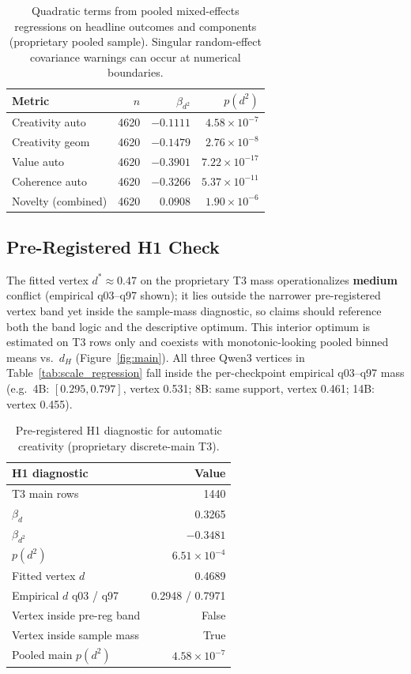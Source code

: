 \documentclass[sigconf,nonacm]{acmart}
\begin{document}
\begin{table}[t]
\centering
\small
\begin{tabular}{lrrr}
\toprule
Metric & $n$ & $\beta_{d^2}$ & $p(d^2)$ \\
\midrule
Creativity auto & 4620 & $-0.1111$ & $4.58{\times}10^{-7}$ \\
Creativity geom & 4620 & $-0.1479$ & $2.76{\times}10^{-8}$ \\
Value auto & 4620 & $-0.3901$ & $7.22{\times}10^{-17}$ \\
Coherence auto & 4620 & $-0.3266$ & $5.37{\times}10^{-11}$ \\
Novelty (combined) & 4620 & $0.0908$ & $1.90{\times}10^{-6}$ \\
\bottomrule
\end{tabular}
\caption{Quadratic terms from pooled mixed-effects regressions on headline outcomes and components (proprietary pooled sample). Singular random-effect covariance warnings can occur at numerical boundaries.}
\label{tab:quadratic}
\end{table}

\subsection{Pre-Registered H1 Check}

The fitted vertex $d^\ast{\approx}0.47$ on the proprietary T3 mass operationalizes \textbf{medium} conflict (empirical q03--q97 shown); it lies outside the narrower pre-registered vertex band yet inside the sample-mass diagnostic, so claims should reference both the band logic and the descriptive optimum. This interior optimum is estimated on T3 rows only and coexists with monotonic-looking pooled binned means vs.\ $d_H$ (Figure~\ref{fig:main}). All three Qwen3 vertices in Table~\ref{tab:scale_regression} fall inside the per-checkpoint empirical q03--q97 mass (e.g.\ 4B: $[0.295,0.797]$, vertex 0.531; 8B: same support, vertex 0.461; 14B: vertex 0.455).

\begin{table}[t]
\centering
\small
\begin{tabular}{lr}
\toprule
H1 diagnostic & Value \\
\midrule
T3 main rows & 1440 \\
$\beta_d$ & 0.3265 \\
$\beta_{d^2}$ & $-0.3481$ \\
$p(d^2)$ & $6.51{\times}10^{-4}$ \\
Fitted vertex $d$ & 0.4689 \\
Empirical $d$ q03 / q97 & 0.2948 / 0.7971 \\
Vertex inside pre-reg band & False \\
Vertex inside sample mass & True \\
Pooled main $p(d^2)$ & $4.58{\times}10^{-7}$ \\
\bottomrule
\end{tabular}
\caption{Pre-registered H1 diagnostic for automatic creativity (proprietary discrete-main T3).}
\label{tab:h1}
\end{table}
\end{document}
